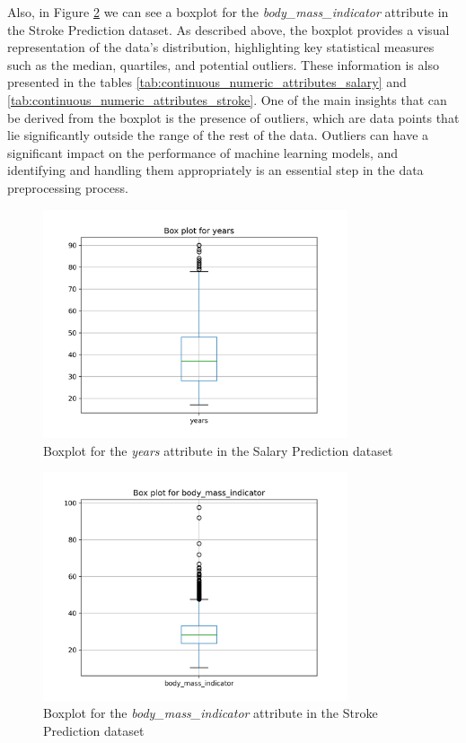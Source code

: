 \documentclass[runningheads]{paper}
\begin{document}
Also, in Figure \ref{fig:boxplot_example_stroke} we can see a boxplot for the
\textit{body\_mass\_indicator} attribute in the Stroke Prediction dataset.
As described above, the boxplot provides a visual representation of the data's
distribution, highlighting key statistical measures such as the median, quartiles,
and potential outliers. These information is also presented in the tables
\ref{tab:continuous_numeric_attributes_salary} and
\ref{tab:continuous_numeric_attributes_stroke}. One of the main insights that
can be derived from the boxplot is the presence of outliers, which are data points
that lie significantly outside the range of the rest of the data. Outliers can
have a significant impact on the performance of machine learning models, and
identifying and handling them appropriately is an essential step in the data
preprocessing process.

\begin{figure}[H]
    \centering
    \includegraphics[width=0.8\textwidth]{../plots/box_plot_years_SalaryPrediction_full.png}
    \caption{Boxplot for the \textit{years} attribute in the Salary Prediction dataset}
    \label{fig:boxplot_example_salary}
\end{figure}

\begin{figure}[H]
    \centering
    \includegraphics[width=0.8\textwidth]{../plots/box_plot_body_mass_indicator_AVC_full.png}
    \caption{Boxplot for the \textit{body\_mass\_indicator} attribute in the Stroke Prediction dataset}
    \label{fig:boxplot_example_stroke}
\end{figure}
\end{document}
